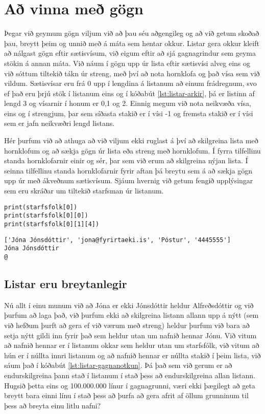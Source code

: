 \section{Að vinna með gögn}\label{uk:gagnavinnsla-listar}
Þegar við geymum gögn viljum við að þau séu aðgengileg og að við getum skoðað þau, breytt þeim og unnið með á máta sem hentar okkur.
Listar gera okkur kleift að nálgast gögn eftir sætisvísum, við eigum eftir að sjá gagnagrindur sem geyma stökin á annan máta.
Við náum í gögn upp úr lista eftir sætisvísi alveg eins og við sóttum tiltekið tákn úr streng, með því að nota hornklofa og það vísa sem við vildum.
Sætisvísar eru frá 0 upp í lengdina á listanum að einum frádregnum, svo ef það eru þrjú stök í listanum eins og í kóðabút \ref{lst:listar-arkir}, þá er listinn af lengd 3 og vísarnir í honum er 0,1 og 2.
Einnig megum við nota neikvæða vísa, eins og í strengjum, þar sem síðasta stakið er í vísi -1 og fremsta stakið er í vísi sem er jafn neikvæðri lengd listans.

Hér þurfum við að athuga að við viljum ekki ruglast á því að skilgreina lista með hornklofum og að sækja gögn úr lista eða streng með hornklofum.
Í fyrra tilfellinu standa hornklofarnir einir og sér, þar sem við erum að skilgreina nýjan lista.
Í seinna tilfellinu standa hornklofarnir fyrir aftan þá breytu sem á að sækja gögn upp úr með ákveðnum sætisvísum.
Sjáum hvernig við getum fengið upplýsingar sem eru skráðar um tiltekið starfsman úr listanum.

\begin{lstlisting}[caption=Unnið með gögn úr lista, label=lst:listar-gagnanotkun]
print(starfsfolk[0])
print(starfsfolk[0][0])
print(starfsfolk[0][1][4])
\end{lstlisting}
\lstset{style=uttak}
\begin{lstlisting}
['Jóna Jónsdóttir', 'jona@fyrirtaeki.is', 'Póstur', '4445555']
Jóna Jónsdóttir
@
\end{lstlisting}
\lstset{style=venjulegt}

\subsection{Listar eru breytanlegir}
Nú allt í einu munum við að Jóna er ekki Jónsdóttir heldur Alfreðsdóttir og við þurfum að laga það, við þurfum ekki að skilgreina listann allann upp á nýtt (sem við hefðum þurft að gera ef við værum með streng) heldur þurfum við bara að setja nýtt gildi inn fyrir það sem heldur utan um nafnið hennar Jónu.
Við vitum að nafnið hennar er í listanum okkar sem heldur utan um starfsfólk, við vitum að hún er í núllta innri listanum og að nafnið hennar er núllta stakið í þeim lista, við sáum það í kóðabút \ref{lst:listar-gagnanotkun}.
Þá það sem við gerum er að endurskilgreina þann stað í listanum í stað þess að endurskilgreina allan listann.
Hugsið þetta eins og 100.000.000 línur í gagnagrunni, væri ekki þægilegt að geta breytt bara einni línu í stað þess að þurfa að gera afrit af öllum grunninum til þess að breyta einu litlu nafni?


